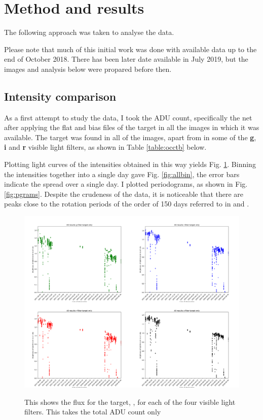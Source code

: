 \section{Method and results}
\protect\label{section:results}

The following approach was taken to analyse the data.

Please note that much of this initial work was done with available data up to
the end of October 2018. There has been later date available in July 2019, but
the images and analysis below were propared before then.

\subsection{Intensity comparison}
\protect\label{section:intcomp}

As a first attempt to study the data, I took the ADU count, specifically the net after applying the flat and bias files
of the target in all the images in which it was available. The target was found in all of the images, apart from in some of the
\textbf{g}, \textbf{i} and \textbf{r} visible light filters, as shown in Table \ref{table:occtb} below.

Plotting light curves of the intensities obtained in this way yields Fig. \ref{fig:allall}.
Binning the intensities together into a single day gave
Fig. \ref{fig:allbin}, the error bars indicate the spread over a single day. I plotted
periodograms, as shown in Fig. \ref{fig:pgrams}. Despite the crudeness of the data, it is noticeable that there are
peaks close to the rotation periods of the order of 150 days referred to in \citet{suarezmascareno15} and \citet{toledopadron18}.

\begin{figure}[!htbp]
\begin{center}
\includegraphics[scale=0.25]{images/allall.png} \\
\end{center}   
\caption{This shows the flux for the target, \bstar, for each of the four visible light filters. This takes the total
  ADU count only}
  \protect\label{fig:allall}
\end{figure}

